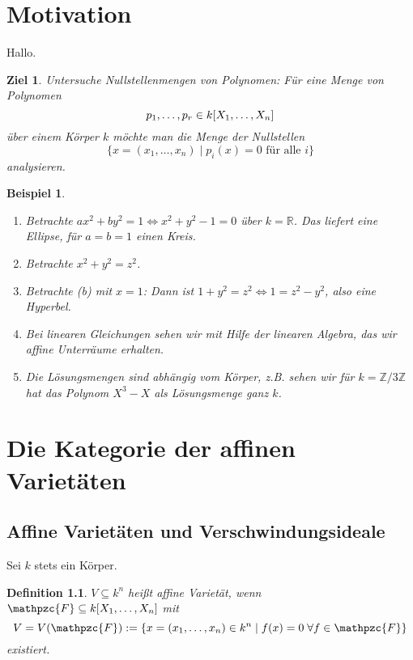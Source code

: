 \documentclass[a4paper,12pt]{scrbook}
\theoremstyle{blah}
\newtheorem*{ziel}{Ziel}
\newtheorem*{bsp*}{Beispiel}
\newtheorem{dfn}{Definition}[section]
\theoremstyle{stz}
\newcommand{\F}{\mathpzc{F}}
\newcommand{\set}[1]{\ensuremath{\mathbb{#1}}}
\newcommand{\R}{\set{R}}
\newcommand{\Z}{\set{Z}}
\newcommand{\polyx}{\ensuremath%
  [X_{1},\dotsc,X_{n}]}
\begin{document}

\chapter*{Motivation}

Hallo.
\begin{ziel}
Untersuche Nullstellenmengen von Polynomen: Für eine Menge von Polynomen
\[p_{1},\dotsc,p_{r}\in k\polyx\]
über einem Körper $k$ möchte man die Menge der Nullstellen
\[\{x=(x_{1},\dotsc,x_{n})\mid p_{i}(x)=0\text{ für alle }i\}\]
analysieren.
\end{ziel}

\begin{bsp*}
\begin{enumerate}
\item Betrachte $ax^{2}+by^{2}=1\iff x^{2}+y^{2}-1=0$ über $k=\R$. Das liefert eine Ellipse, für $a=b=1$ einen Kreis.
\item Betrachte $x^{2}+y^{2}=z^{2}$.
\item Betrachte (b) mit $x=1$: Dann ist $1+y^{2}=z^{2}\iff 1=z^{2}-y^{2}$, also eine Hyperbel.
\item Bei linearen Gleichungen sehen wir mit Hilfe der linearen Algebra, das wir affine Unterräume erhalten.
\item Die Lösungsmengen sind abhängig vom Körper, z.B. sehen wir für $k=\Z/3\Z$ hat das Polynom $X^{3}-X$ als Lösungsmenge ganz $k$.
\end{enumerate}
\end{bsp*}


\chapter{Die Kategorie der affinen Varietäten}
\section{Affine Varietäten und Verschwindungsideale}

Sei $k$ stets ein Körper.

\begin{dfn}
$V\subseteq k^{n}$ heißt \emph{affine Varietät}, wenn
$\F\subseteq k\polyx$
mit \[V=V(\F):=\{x=(x_{1},\dotsc,x_{n})\in k^{n}\mid f(x)=0\;\forall f\in\F\}\] existiert.
\end{dfn}
\end{document}
